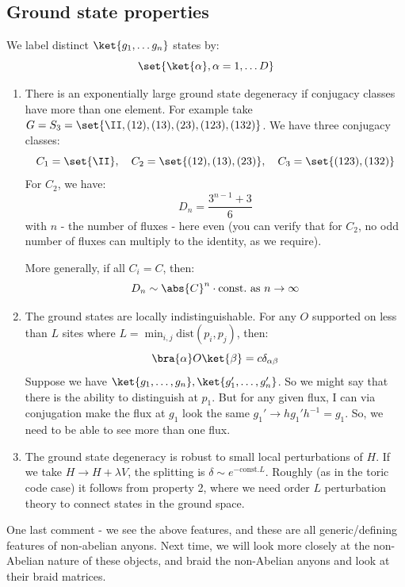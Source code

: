 \subsection{Ground state properties}
We label distinct $\ket{g_1, \ldots g_n}$ states by:
\begin{equation}
    \set{\ket{\alpha}, \alpha = 1, \ldots D}
\end{equation}
\begin{enumerate}
    \item There is an exponentially large ground state degeneracy if conjugacy classes have more than one element. For example take $G = S_3 = \set{\II, (12), (13), (23), (123), (132)}$. We have three conjugacy classes:
    \begin{equation}
        C_1 = \set{\II}, \quad C_2 = \set{(12), (13), (23)}, \quad C_3 = \set{(123), (132)}
    \end{equation}
    For $C_2$, we have:
    \begin{equation}
        D_n = \frac{3^{n-1} + 3}{6}
    \end{equation}
    with $n$ - the number of fluxes - here even (you can verify that for $C_2$, no odd number of fluxes can multiply to the identity, as we require).

    More generally, if all $C_i = C$, then:
    \begin{equation}
        D_n \sim \abs{C}^n \cdot \text{const.} \text{ as $n \to \infty$}
    \end{equation}

    \item The ground states are locally indistinguishable. For any $O$ supported on less than $L$ sites where $L = \min_{i, j} \text{dist}(p_i, p_j)$, then:
    \begin{equation}
        \bra{\alpha}O\ket{\beta} = c\delta_{\alpha\beta}
    \end{equation}
    Suppose we have $\ket{g_1, \ldots, g_n}, \ket{g_1', \ldots, g_n'}$. So we might say that there is the ability to distinguish at $p_1$. But for any given flux, I can via conjugation make the flux at $g_1$ look the same $g_1' \to h g_1' h^{-1} = g_1$. So, we need to be able to see more than one flux.

    \item The ground state degeneracy is robust to small local perturbations of $H$. If we take $H \to H + \lambda V$, the splitting is $\delta \sim e^{-\text{const.}L}$. Roughly (as in the toric code case) it follows from property 2, where we need order $L$ perturbation theory to connect states in the ground space.
\end{enumerate}

One last comment - we see the above features, and these are all generic/defining features of non-abelian anyons. Next time, we will look more closely at the non-Abelian nature of these objects, and braid the non-Abelian anyons and look at their braid matrices.